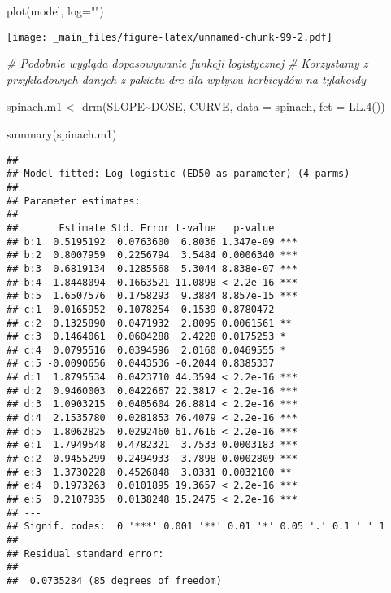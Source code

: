 \documentclass[
]{book}
\newenvironment{Shaded}{\begin{snugshade}}{\end{snugshade}}
\newcommand{\AttributeTok}[1]{\textcolor[rgb]{0.77,0.63,0.00}{#1}}
\newcommand{\CommentTok}[1]{\textcolor[rgb]{0.56,0.35,0.01}{\textit{#1}}}
\newcommand{\FunctionTok}[1]{\textcolor[rgb]{0.00,0.00,0.00}{#1}}
\newcommand{\NormalTok}[1]{#1}
\newcommand{\OtherTok}[1]{\textcolor[rgb]{0.56,0.35,0.01}{#1}}
\newcommand{\SpecialCharTok}[1]{\textcolor[rgb]{0.00,0.00,0.00}{#1}}
\newcommand{\StringTok}[1]{\textcolor[rgb]{0.31,0.60,0.02}{#1}}
\begin{document}
\begin{Shaded}
\begin{Highlighting}[]
\FunctionTok{plot}\NormalTok{(model, }\AttributeTok{log=}\StringTok{""}\NormalTok{)}
\end{Highlighting}
\end{Shaded}

\texttt{[image: \_main\_files/figure-latex/unnamed-chunk-99-2.pdf]}

\begin{Shaded}
\begin{Highlighting}[]
\CommentTok{\# Podobnie wygląda dopasowywanie funkcji logistycznej}
\CommentTok{\# Korzystamy z przykładowych danych z pakietu drc dla wpływu herbicydów na tylakoidy}

\NormalTok{spinach.m1 }\OtherTok{\textless{}{-}} \FunctionTok{drm}\NormalTok{(SLOPE}\SpecialCharTok{\textasciitilde{}}\NormalTok{DOSE, CURVE, }\AttributeTok{data =}\NormalTok{ spinach, }\AttributeTok{fct =} \FunctionTok{LL.4}\NormalTok{())}

\FunctionTok{summary}\NormalTok{(spinach.m1)}
\end{Highlighting}
\end{Shaded}

\begin{verbatim}
## 
## Model fitted: Log-logistic (ED50 as parameter) (4 parms)
## 
## Parameter estimates:
## 
##       Estimate Std. Error t-value   p-value    
## b:1  0.5195192  0.0763600  6.8036 1.347e-09 ***
## b:2  0.8007959  0.2256794  3.5484 0.0006340 ***
## b:3  0.6819134  0.1285568  5.3044 8.838e-07 ***
## b:4  1.8448094  0.1663521 11.0898 < 2.2e-16 ***
## b:5  1.6507576  0.1758293  9.3884 8.857e-15 ***
## c:1 -0.0165952  0.1078254 -0.1539 0.8780472    
## c:2  0.1325890  0.0471932  2.8095 0.0061561 ** 
## c:3  0.1464061  0.0604288  2.4228 0.0175253 *  
## c:4  0.0795516  0.0394596  2.0160 0.0469555 *  
## c:5 -0.0090656  0.0443536 -0.2044 0.8385337    
## d:1  1.8795534  0.0423710 44.3594 < 2.2e-16 ***
## d:2  0.9460003  0.0422667 22.3817 < 2.2e-16 ***
## d:3  1.0903215  0.0405604 26.8814 < 2.2e-16 ***
## d:4  2.1535780  0.0281853 76.4079 < 2.2e-16 ***
## d:5  1.8062825  0.0292460 61.7616 < 2.2e-16 ***
## e:1  1.7949548  0.4782321  3.7533 0.0003183 ***
## e:2  0.9455299  0.2494933  3.7898 0.0002809 ***
## e:3  1.3730228  0.4526848  3.0331 0.0032100 ** 
## e:4  0.1973263  0.0101895 19.3657 < 2.2e-16 ***
## e:5  0.2107935  0.0138248 15.2475 < 2.2e-16 ***
## ---
## Signif. codes:  0 '***' 0.001 '**' 0.01 '*' 0.05 '.' 0.1 ' ' 1
## 
## Residual standard error:
## 
##  0.0735284 (85 degrees of freedom)
\end{verbatim}
\end{document}
